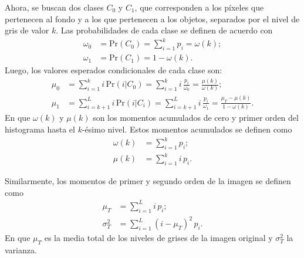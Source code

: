 Ahora, se buscan dos clases $C_0$ y $C_1$, que corresponden a los píxeles que pertenecen al fondo y a los que pertenecen a los objetos, separados por el nivel de gris de valor $k$.
Las probabilidades de cada clase se definen de acuerdo con
%
\begin{subequations}
    \label{eq:otsu_class_probs}
    \begin{align}
        \omega_0 &= \mathrm{Pr}\left(C_0\right) = \sum_{i = 1}^k p_i = \omega(k); \label{eq:otsu_class_probs_1} \\
        \omega_1 &= \mathrm{Pr}\left(C_1\right) = 1 - \omega(k). \label{eq:otsu_class_probs2}
    \end{align}
\end{subequations}
%
Luego, los valores esperados condicionales de cada clase son:
%
\begin{subequations}
    \label{eq:otsu_expected_values}
    \begin{align}
        \mu_0 &= \sum_{i = 1}^k i\,\mathrm{Pr}\left(i|C_0\right) =
        \sum_{i = 1}^k i\,\frac{p_i}{\omega_0} = \frac{\mu(k)}{\omega(k)}; \label{eq:otsu_expected_values_1} \\
        \mu_1 &= \sum_{i = k + 1}^L i\,\mathrm{Pr}\left(i|C_i\right) =
        \sum_{i = k + 1}^L i\,\frac{p_i}{\omega_1} =
        \frac{\mu_T - \mu(k)}{1 - \omega(k)}. \label{eq:otsu_expected_values_2}
    \end{align}
\end{subequations}
%
En que $\omega(k)$ y $\mu(k)$ son los momentos acumulados de cero y primer orden del histograma hasta el $k$-ésimo nivel.
Estos momentos acumulados se definen como
%
\begin{subequations}
    \label{eq:otsu_cumulative_moments}
    \begin{align}
        \omega(k) &= \sum_{i = 1}^k p_i; \label{eq:otsu_cumulative_moments_1} \\
        \mu(k) &= \sum_{i = 1}^k i\,p_i.\label{eq:otsu_cumulative_moments_2}
    \end{align}
\end{subequations}

Similarmente, los momentos de primer y segundo orden de la imagen se definen como
%
\begin{subequations}
    \label{eq:otsu_total_moments}
    \begin{align}
        \mu_T &= \sum_{i = 1}^L i\,p_i; \label{eq:otsu_total_moments_1} \\
        \sigma_T^2 &= \sum_{i = 1}^L \left(i - \mu_T\right)^2\,p_i. \label{eq:otsu_total_moments_2}
    \end{align}
\end{subequations}
%
En que $\mu_T$ es la media total de los niveles de grises de la imagen original y $\sigma_T^2$ la varianza.

